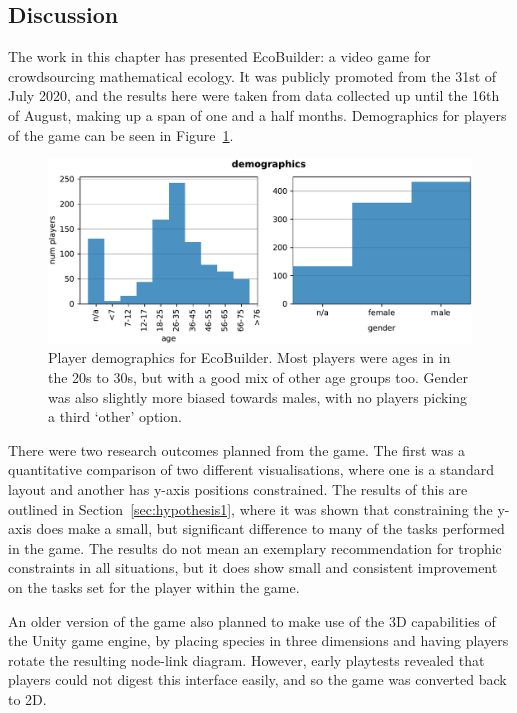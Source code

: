 \subsection{Discussion}
\label{sec:eco_discussion}

The work in this chapter has presented EcoBuilder: a video game for crowdsourcing mathematical ecology. It was publicly promoted from the 31st of July 2020, and the results here were taken from data collected up until the 16th of August, making up a span of one and a half months. Demographics for players of the game can be seen in Figure~\ref{fig:demo}.

\begin{figure}
  \centering
  \includegraphics[width=\textwidth, right]{joy/demo.pdf}
  \caption[Player demographics]{Player demographics for EcoBuilder. Most players were ages in in the 20s to 30s, but with a good mix of other age groups too. Gender was also slightly more biased towards males, with no players picking a third `other' option.}
  \label{fig:demo}
\end{figure}

There were two research outcomes planned from the game. The first was a quantitative comparison of two different visualisations, where one is a standard layout and another has y-axis positions constrained. The results of this are outlined in Section~\ref{sec:hypothesis1}, where it was shown that constraining the y-axis does make a small, but significant difference to many of the tasks performed in the game.
The results do not mean an exemplary recommendation for trophic constraints in all situations, but it does show small and consistent improvement on the tasks set for the player within the game.

An older version of the game also planned to make use of the 3D capabilities of the Unity game engine, by placing species in three dimensions and having players rotate the resulting node-link diagram. However, early playtests revealed that players could not digest this interface easily, and so the game was converted back to 2D.

